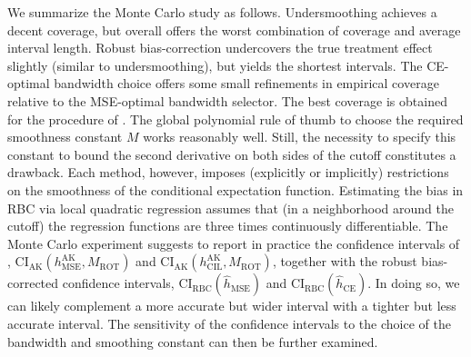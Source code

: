 We summarize the Monte Carlo study as follows.
Undersmoothing achieves a decent coverage, but overall offers the worst combination of coverage and average interval length.
Robust bias-correction undercovers the true treatment effect slightly (similar to undersmoothing),
but yields the shortest intervals.
The CE-optimal bandwidth choice offers some small refinements in empirical coverage relative to the MSE-optimal bandwidth selector.
The best coverage is obtained for the procedure of \citeauthor{Armstrong_2020}.
The global polynomial rule of thumb to choose the required smoothness constant $M$ works reasonably well.
Still, the necessity to specify this constant to bound the second derivative on both sides of the cutoff constitutes a drawback.
Each method, however, imposes (explicitly or implicitly) restrictions on the smoothness of the conditional expectation function.
Estimating the bias in RBC via local quadratic regression assumes that (in a neighborhood around the cutoff)
the regression functions are three times continuously differentiable.
The Monte Carlo experiment suggests to report in practice the confidence intervals of \citeauthor{Armstrong_2020},
$\text{CI}_{\text{AK}}(h^{\text{AK}}_{\text{MSE}}, M_{\text{ROT}})$ and $\text{CI}_{\text{AK}}(h^{\text{AK}}_{\text{CIL}}, M_{\text{ROT}})$,
together with the robust bias-corrected confidence intervals,  
$\text{CI}_{\text{RBC}}(\hat{h}_{\text{MSE}})$ and $\text{CI}_{\text{RBC}}(\hat{h}_{\text{CE}})$.
In doing so, we can likely complement a more accurate but wider interval with a tighter but less accurate interval.
The sensitivity of the confidence intervals to the choice of the bandwidth and smoothing constant can then be further examined.